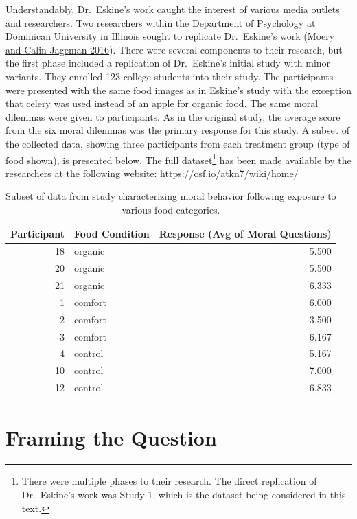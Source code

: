 \documentclass[
]{book}
\theoremstyle{plain}
\theoremstyle{mydefn}
\theoremstyle{myexmpl}
\theoremstyle{remark}
\begin{document}
Understandably, Dr.~Eskine's work caught the interest of various media outlets and researchers. Two researchers within the Department of Psychology at Dominican University in Illinois sought to replicate Dr.~Eskine's work (\protect\hyperlink{ref-Moery2016}{Moery and Calin-Jageman 2016}). There were several components to their research, but the first phase included a replication of Dr.~Eskine's initial study with minor variants. They enrolled 123 college students into their study. The participants were presented with the same food images as in Eskine's study with the exception that celery was used instead of an apple for organic food. The same moral dilemmas were given to participants. As in the original study, the average score from the six moral dilemmas was the primary response for this study. A subset of the collected data, showing three participants from each treatment group (type of food shown), is presented below. The full dataset\footnote{There were multiple phases to their research. The direct replication of Dr.~Eskine's work was Study 1, which is the dataset being considered in this text.} has been made available by the researchers at the following website: \url{https://osf.io/atkn7/wiki/home/}

\begin{table}

\caption{\label{tab:caseorganic-table}Subset of data from study characterizing moral behavior following exposure to various food categories.}
\centering
\begin{tabular}[t]{r|l|r}
\hline
Participant & Food Condition & Response (Avg of Moral Questions)\\
\hline
18 & organic & 5.500\\
\hline
20 & organic & 5.500\\
\hline
21 & organic & 6.333\\
\hline
1 & comfort & 6.000\\
\hline
2 & comfort & 3.500\\
\hline
3 & comfort & 6.167\\
\hline
4 & control & 5.167\\
\hline
10 & control & 7.000\\
\hline
12 & control & 6.833\\
\hline
\end{tabular}
\end{table}

\hypertarget{ANOVAquestions}{%
\chapter{Framing the Question}\label{ANOVAquestions}}
\end{document}
